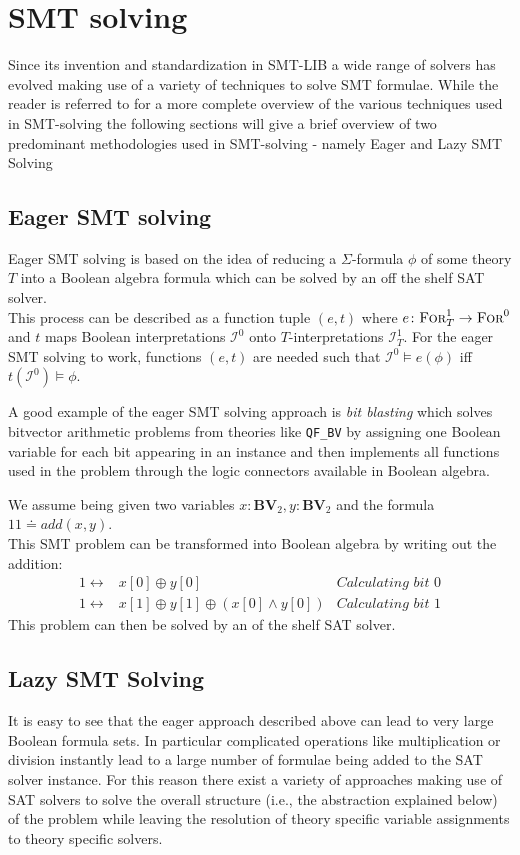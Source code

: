 \section{SMT solving}
Since its invention and standardization in SMT-LIB \cite{BarFT-SMTLIB} a wide range of solvers has evolved making use of a variety of techniques to solve SMT formulae. While the reader is referred to \cite{Barrett-Tinelli-SMT} for a more complete overview of the various techniques used in SMT-solving the following sections will give a brief overview of two predominant methodologies used in SMT-solving - namely Eager and Lazy SMT Solving 
\subsection{Eager SMT solving}
Eager SMT solving is based on the idea of reducing a $\Sigma$-formula $\phi$ of some theory $T$ into a Boolean algebra formula which can be solved by an off the shelf SAT solver.\\
This process can be described as a function tuple $(e,t)$ where $e\colon\textsc{For}^1_T\to\textsc{For}^0$ and $t$ maps Boolean interpretations $\mathcal{I}^0$ onto $T$-interpretations $\mathcal{I}^1_T$. For the eager SMT solving to work, functions $(e,t)$ are needed such that $\mathcal{I}^0\vDash e\left(\phi\right)$ iff $t\left(\mathcal{I}^0\right)\vDash\phi$.
\par
A good example of the eager SMT solving approach is \textit{bit blasting} which solves bitvector arithmetic problems from theories like \texttt{QF\_BV} by assigning one Boolean variable for each bit appearing in an instance and then implements all functions used in the problem through the logic connectors available in Boolean algebra.
\begin{example}[Addition]
We assume being given two variables $x\colon\mathbf{BV}_2, y\colon\mathbf{BV}_2$ and the formula $11\doteq add\left(x,y\right)$.\\
This SMT problem can be transformed into Boolean algebra by writing out the addition:
\begin{align*}
1 \leftrightarrow & x[0] \oplus y[0] & \textit{Calculating bit 0}\\
1 \leftrightarrow & x[1] \oplus y[1] \oplus \left(x[0] \land y[0] \right) & \textit{Calculating bit 1}
\end{align*}
This problem can then be solved by an of the shelf SAT solver.
\end{example}

\subsection{Lazy SMT Solving}
It is easy to see that the eager approach described above can lead to very large Boolean formula sets. In particular complicated operations like multiplication or division instantly lead to a large number of formulae being added to the SAT solver instance. For this reason there exist a variety of approaches making use of SAT solvers to solve the overall structure (i.e., the abstraction explained below) of the problem while leaving the resolution of theory specific variable assignments to theory specific solvers.

